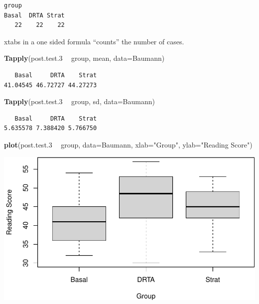 \documentclass[
]{article}
\newenvironment{Shaded}{\begin{snugshade}}{\end{snugshade}}
\newcommand{\DataTypeTok}[1]{\textcolor[rgb]{0.13,0.29,0.53}{#1}}
\newcommand{\FloatTok}[1]{\textcolor[rgb]{0.00,0.00,0.81}{#1}}
\newcommand{\KeywordTok}[1]{\textcolor[rgb]{0.13,0.29,0.53}{\textbf{#1}}}
\newcommand{\NormalTok}[1]{#1}
\newcommand{\OperatorTok}[1]{\textcolor[rgb]{0.81,0.36,0.00}{\textbf{#1}}}
\newcommand{\StringTok}[1]{\textcolor[rgb]{0.31,0.60,0.02}{#1}}
\begin{document}
\begin{verbatim}
group
Basal  DRTA Strat 
   22    22    22 
\end{verbatim}

xtabs in a one sided formula ``counts'' the number of cases.

\begin{Shaded}
\begin{Highlighting}[]
\KeywordTok{Tapply}\NormalTok{(post.test}\FloatTok{.3} \OperatorTok{~}\StringTok{ }\NormalTok{group, mean, }\DataTypeTok{data=}\NormalTok{Baumann)}
\end{Highlighting}
\end{Shaded}

\begin{verbatim}
   Basal     DRTA    Strat 
41.04545 46.72727 44.27273 
\end{verbatim}

\begin{Shaded}
\begin{Highlighting}[]
\KeywordTok{Tapply}\NormalTok{(post.test}\FloatTok{.3} \OperatorTok{~}\StringTok{ }\NormalTok{group, sd, }\DataTypeTok{data=}\NormalTok{Baumann)}
\end{Highlighting}
\end{Shaded}

\begin{verbatim}
   Basal     DRTA    Strat 
5.635578 7.388420 5.766750 
\end{verbatim}

\begin{Shaded}
\begin{Highlighting}[]
\KeywordTok{plot}\NormalTok{(post.test}\FloatTok{.3} \OperatorTok{~}\StringTok{ }\NormalTok{group, }\DataTypeTok{data=}\NormalTok{Baumann, }\DataTypeTok{xlab=}\StringTok{"Group"}\NormalTok{,}
    \DataTypeTok{ylab=}\StringTok{"Reading Score"}\NormalTok{)}
\end{Highlighting}
\end{Shaded}

\includegraphics{emmeansNotes_files/figure-latex/unnamed-chunk-3-1.pdf}
\end{document}
